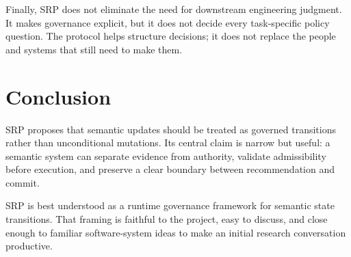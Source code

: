 \documentclass[10pt]{article}
\begin{document}
Finally, SRP does not eliminate the need for downstream engineering judgment. It makes governance explicit, but it does not decide every task-specific policy question. The protocol helps structure decisions; it does not replace the people and systems that still need to make them.

\section{Conclusion}
SRP proposes that semantic updates should be treated as governed transitions rather than unconditional mutations. Its central claim is narrow but useful: a semantic system can separate evidence from authority, validate admissibility before execution, and preserve a clear boundary between recommendation and commit.

SRP is best understood as a runtime governance framework for semantic state transitions. That framing is faithful to the project, easy to discuss, and close enough to familiar software-system ideas to make an initial research conversation productive.
\end{document}
